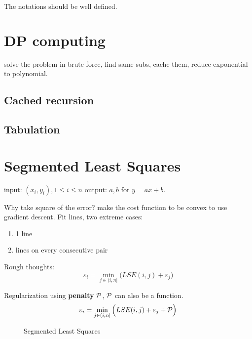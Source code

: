 \documentclass[a4paper]{report}
\theoremstyle{definition}
\begin{document}
The notations should be well defined.


\section{DP computing}
solve the problem in brute force, find same subs, cache them, reduce exponential to polynomial.
\subsection{Cached recursion}
\subsection{Tabulation}
\section{Segmented Least Squares}
input: $(x_i, y_i), 1\leq i\leq n$ output: $a, b$ for $y=ax+b$.

Why take square of the error? make the cost function to be convex to use gradient descent.
Fit lines, two extreme cases:
\begin{enumerate}
\item 1 line
\item lines on every consecutive pair
\end{enumerate}

Rough thoughts:
$$
\varepsilon_i = \min_{j\in (i, n]} \Big(LSE(i, j)+\varepsilon_j\Big)
$$

Regularization using \textbf{penalty} $\mathcal{P}$, $\mathcal{P}$ can also be a function.
$$
\varepsilon_i = \min_{j\in (i, n]} \Big(LSE(i, j)+\varepsilon_j+\mathcal{P}\Big)
$$
\begin{figure}[!htp]
\centering
{}
\caption{Segmented Least Squares}
\label{fig:6_9}
\end{figure}
\end{document}
